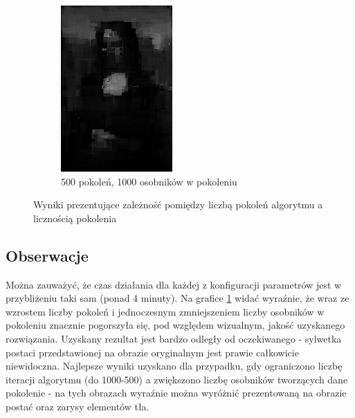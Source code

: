 \begin{figure}[!htb]
\begin{subfigure}[b]{0.3\textwidth}
         \includegraphics[width=\textwidth]{images/mona/dependence/500_1000.png}
         \caption{500 pokoleń, 1000 osobników w pokoleniu}
    \end{subfigure}
    \caption{Wyniki prezentujące zależność pomiędzy liczbą pokoleń algorytmu a licznością pokolenia}
    \label{fig:dependence_rep}
\end{figure}

\subsection{Obserwacje}
Można zauważyć, że czas działania dla każdej z konfiguracji parametrów jest w przybliżeniu taki sam (ponad 4 minuty). Na grafice \ref{fig:dependence_rep} widać wyraźnie, że wraz ze wzrostem liczby pokoleń i jednoczesnym zmniejszeniem liczby osobników w pokoleniu znacznie pogorszyła się, pod względem wizualnym, jakość uzyskanego rozwiązania. Uzyskany rezultat jest bardzo odległy od oczekiwanego - sylwetka postaci przedstawionej na obrazie oryginalnym jest prawie całkowicie niewidoczna.  Najlepsze wyniki uzyskano dla przypadku, gdy ograniczono liczbę iteracji algorytmu (do 1000-500) a zwiększono liczbę osobników tworzących dane pokolenie - na tych obrazach wyraźnie można wyróżnić prezentowaną na obrazie postać oraz zarysy elementów tła.

